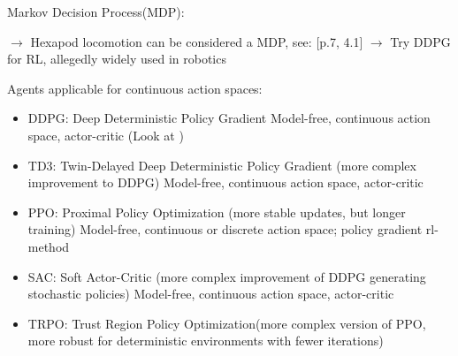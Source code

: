 Markov Decision Process(MDP):

$\rightarrow$ Hexapod locomotion can be considered a MDP, see: \parencite{ouyang2021adaptive} [p.7, 4.1]
$\rightarrow$ Try DDPG for RL, allegedly widely used in robotics \parencite{ouyang2021adaptive}


Agents applicable for continuous action spaces: 
\begin{itemize}		
	\item DDPG: Deep Deterministic Policy Gradient
	Model-free, continuous action space, actor-critic (Look at \parencite{trotta2022walking})
	\item TD3: Twin-Delayed Deep Deterministic Policy Gradient (more complex improvement to DDPG)
	Model-free, continuous action space, actor-critic
	\item PPO: Proximal Policy Optimization (more stable updates, but longer training)
	Model-free, continuous or discrete action space; policy gradient rl-method
	\item SAC: Soft Actor-Critic (more complex improvement of DDPG generating stochastic policies)
	Model-free, continuous action space, actor-critic
	\item TRPO: Trust Region Policy Optimization(more complex version of PPO, more robust for deterministic environments with fewer iterations)
\end{itemize}
